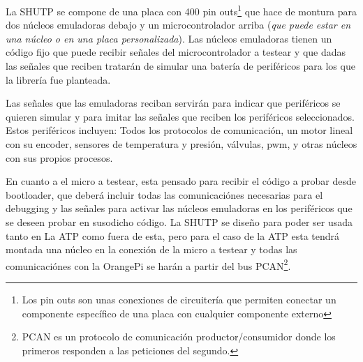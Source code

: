 \documentclass{report}
\begin{document}
La SHUTP se compone de una placa con 400 pin outs\footnote{Los pin outs son unas conexiones de circuitería que permiten conectar un componente específico de una placa con cualquier componente externo} que hace de montura para dos núcleos emuladoras debajo y un microcontrolador arriba (\textit{que puede estar en una núcleo o en una placa personalizada}). Las núcleos emuladoras tienen un código fijo que puede recibir señales del microcontrolador a testear y que dadas las señales que reciben tratarán de simular una batería de periféricos para los que la librería fue planteada. \par
Las señales que las emuladoras reciban servirán para indicar que periféricos se quieren simular y para imitar las señales que reciben los periféricos seleccionados. Estos periféricos incluyen: Todos los protocolos de comunicación, un motor lineal con su encoder, sensores de temperatura y presión, válvulas, pwm, y otras núcleos con sus propios procesos. 
\par \vspace{0.3cm}
En cuanto a el micro a testear, esta pensado para recibir el código a probar desde bootloader, que deberá incluir todas las comunicaciónes necesarias para el debugging y las señales para activar las núcleos emuladoras en los periféricos que se deseen probar en susodicho código. La SHUTP se diseño para poder ser usada tanto en La ATP como fuera de esta, pero para el caso de la ATP esta tendrá montada una núcleo en la conexión de la micro a testear y todas las comunicaciónes con la OrangePi se harán a partir del bus PCAN\footnote{PCAN es un protocolo de comunicación productor/consumidor donde los primeros responden a las peticiones del segundo.}.
\par \vspace{0.3cm}
\end{document}
